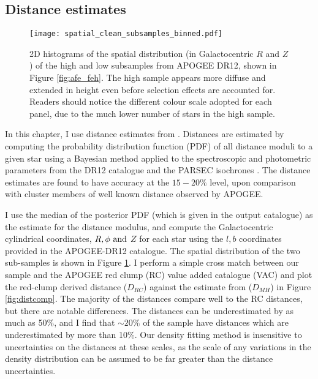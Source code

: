  \subsection{Distance estimates}
 \label{sec:distances}
 
  \begin{figure}
 \centering
 	\texttt{[image: spatial\_clean\_subsamples\_binned.pdf]}
     \caption[The Galactocentric $R$ and $z$ distribution of stars in the APOGEE DR12 high and low \afe{} populations]{2D histograms of the spatial distribution (in Galactocentric $R$ and $Z$) of the high and low \afe{} subsamples from APOGEE DR12, shown in Figure \ref{fig:afe_feh}. The high \afe{} sample appears more diffuse and extended in height even before selection effects are accounted for. Readers should notice the different colour scale adopted for each panel, due to the much lower number of stars in the high \afe{} sample.}
     \label{fig:spatial}
 \end{figure}
In this chapter, I use distance estimates from \citet{2014AJ....147..116H} \citep[But see also][for further description]{2015ApJ...808..132H}. Distances are estimated by computing the probability distribution function (PDF) of all distance moduli to a given star using a Bayesian method applied to the spectroscopic and photometric parameters from the DR12 catalogue and the PARSEC isochrones \citep{2012MNRAS.427..127B}. The distance estimates are found to have accuracy at the $15-20\%$ level, upon comparison with cluster members of well known distance observed by APOGEE. 

I use the median of the posterior PDF (which is given in the output catalogue) as the estimate for the distance modulus, and compute the Galactocentric cylindrical coordinates, $R, \phi\ \rm{and}$  $Z$ for each star using the $l,b$ coordinates provided in the APOGEE-DR12 catalogue. The spatial distribution of the two \afe{} sub-samples is shown in Figure \ref{fig:spatial}. I perform a simple cross match between our sample and the APOGEE red clump (RC) value added catalogue (VAC) \citep{2014ApJ...790..127B} and plot the red-clump derived distance ($D_{RC}$) against the estimate from \citet{2014AJ....147..116H} ($D_{MH}$) in Figure \ref{fig:distcomp}. The majority of the \citet{2014AJ....147..116H} distances compare well to the RC distances, but there are notable differences. The \citet{2014AJ....147..116H} distances can be underestimated by as much as 50\%, and I find that $\sim20\%$ of the sample have distances which are underestimated by more than 10\%. Our density fitting method is insensitive to uncertainties on the distances at these scales, as the scale of any variations in the density distribution can be assumed to be far greater than the distance uncertainties. 

